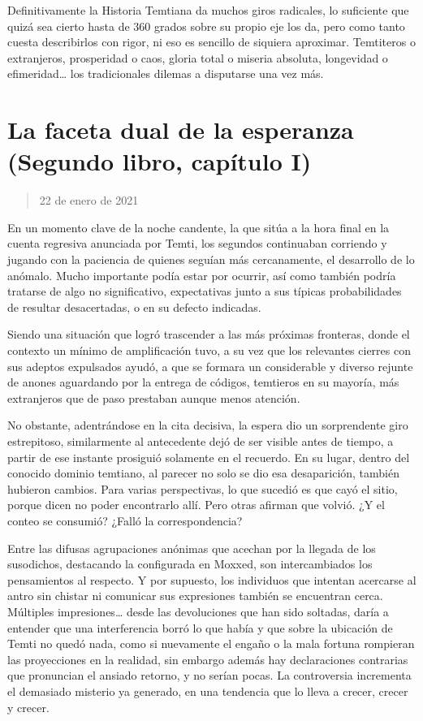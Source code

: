 \documentclass[
]{book}
\begin{document}
Definitivamente la Historia Temtiana da muchos giros radicales, lo suficiente que quizá sea cierto hasta de 360 grados sobre su propio eje los da, pero como tanto cuesta describirlos con rigor, ni eso es sencillo de siquiera aproximar. Temtiteros o extranjeros, prosperidad o caos, gloria total o miseria absoluta, longevidad o efimeridad\ldots{} los tradicionales dilemas a disputarse una vez más.

\hypertarget{la-faceta-dual-de-la-esperanza-segundo-libro-capuxedtulo-i}{%
\section{La faceta dual de la esperanza (Segundo libro, capítulo I)}\label{la-faceta-dual-de-la-esperanza-segundo-libro-capuxedtulo-i}}

\begin{quote}
22 de enero de 2021
\end{quote}

En un momento clave de la noche candente, la que sitúa a la hora final en la cuenta regresiva anunciada por Temti, los segundos continuaban corriendo y jugando con la paciencia de quienes seguían más cercanamente, el desarrollo de lo anómalo. Mucho importante podía estar por ocurrir, así como también podría tratarse de algo no significativo, expectativas junto a sus típicas probabilidades de resultar desacertadas, o en su defecto indicadas.

Siendo una situación que logró trascender a las más próximas fronteras, donde el contexto un mínimo de amplificación tuvo, a su vez que los relevantes cierres con sus adeptos expulsados ayudó, a que se formara un considerable y diverso rejunte de anones aguardando por la entrega de códigos, temtieros en su mayoría, más extranjeros que de paso prestaban aunque menos atención.

No obstante, adentrándose en la cita decisiva, la espera dio un sorprendente giro estrepitoso, similarmente al antecedente dejó de ser visible antes de tiempo, a partir de ese instante prosiguió solamente en el recuerdo. En su lugar, dentro del conocido dominio temtiano, al parecer no solo se dio esa desaparición, también hubieron cambios. Para varias perspectivas, lo que sucedió es que cayó el sitio, porque dicen no poder encontrarlo allí. Pero otras afirman que volvió. ¿Y el conteo se consumió? ¿Falló la correspondencia?

Entre las difusas agrupaciones anónimas que acechan por la llegada de los susodichos, destacando la configurada en Moxxed, son intercambiados los pensamientos al respecto. Y por supuesto, los individuos que intentan acercarse al antro sin chistar ni comunicar sus expresiones también se encuentran cerca. Múltiples impresiones\ldots{} desde las devoluciones que han sido soltadas, daría a entender que una interferencia borró lo que había y que sobre la ubicación de Temti no quedó nada, como si nuevamente el engaño o la mala fortuna rompieran las proyecciones en la realidad, sin embargo además hay declaraciones contrarias que pronuncian el ansiado retorno, y no serían pocas. La controversia incrementa el demasiado misterio ya generado, en una tendencia que lo lleva a crecer, crecer y crecer.
\end{document}
